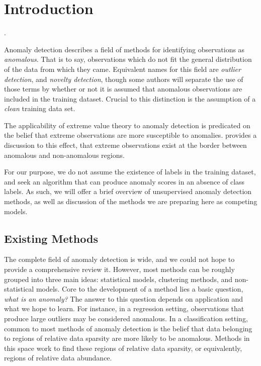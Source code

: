 \section{Introduction}

.

Anomaly detection describes a field of methods for identifying observations as \emph{anomalous}.  That
  is to say, observations which do not fit the general distribution of the data from which they came.
  Equivalent names for this field are \emph{outlier detection}, and \emph{novelty detection}, though
  some authors will separate the use of those terms by whether or not it is assumed that anomalous
  observations are included in the training dataset.  Crucial to this distinction is the assumption
  of a \emph{clean} training data set.

The applicability of extreme value theory to anomaly detection is predicated on the belief that
  extreme observations are more susceptible to anomalies.  \cite{goix2017} provides a discussion to
  this effect, that extreme observations exist at the border between anomalous and non-anomalous regions.

For our purpose, we do not assume the existence of labels in the training dataset, and seek an
  algorithm that can produce anomaly scores in an absence of class labels. As such, we will offer
  a brief overview of unsupervised anomaly detection methods, as well as discussion of the methods
  we are preparing here as competing models.

\subsection{Existing Methods}
The complete field of anomaly detection is wide, and we could not hope to provide a comprehensive review
    it.  However, most methods can be roughly grouped into three main ideas: statistical models, clustering
    methods, and non-statistical models. Core to the development of a method lies a basic question,
    \emph{what is an anomaly?}  The answer to this question depends on application and what we hope to
    learn.  For instance, in a regression setting, observations that produce large outliers may be considered
    anomalous.  In a classification setting, common to most methods of anomaly detection is the belief
    that data belonging to regions of relative data sparsity are more likely to be anomalous.  Methods in
    this space work to find these regions of relative data sparsity, or equivalently, regions of relative
    data abundance.

